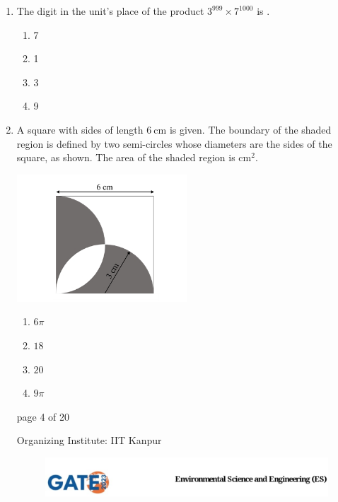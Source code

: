 \documentclass[journal,12pt,onecolumn]{IEEEtran}
\theoremstyle{remark}
\begin{document}
\begin{enumerate}[start=1, label={Q\arabic*.}]
\begin{figure}
\end{figure}
\item The digit in the unit's place of the product $3^{999} \times 7^{1000}$ is \underline{\hspace{1cm}}. 

\begin{enumerate}[label=(\Alph*)]
\item 7
\item 1
\item 3
\item 9
\end{enumerate}
\hfill{}
\item A square with sides of length $6 \ \text{cm}$ is given. The boundary of the shaded region is defined by two semi-circles whose diameters are the sides of the square, as shown. The area of the shaded region is \underline{\hspace{1cm}} $\text{cm}^2$. 

\begin{center}
\includegraphics[width=0.5\textwidth]{figs/img 3.jpeg}
\end{center}

\begin{enumerate}[label=(\Alph*)]
\item $6\pi$
\item $18$
\item $20$
\item $9\pi$
\end{enumerate}
\hfill{}
\vfill
\begin{center}
{\Large page 4 of 20}
\end{center}
\RaggedRight
{\color{orange}
{\Large Organizing Institute: IIT Kanpur}}
\newpage
\begin{figure}
    
    \includegraphics[width=1\linewidth]{figs/latex.jpg}
    

\end{figure}
\end{enumerate}
\end{document}
